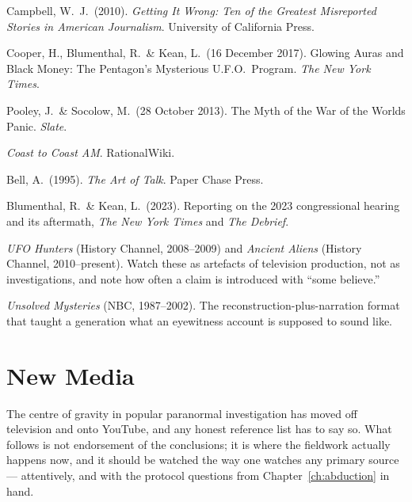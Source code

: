 \begin{list}{}{\setlength{\leftmargin}{1.2em}\setlength{\itemindent}{-1.2em}
\setlength{\itemsep}{3pt}}
\item Campbell, W.\ J.\ (2010). \emph{Getting It Wrong: Ten of the Greatest Misreported Stories in
American Journalism}. University of California Press.
\item Cooper, H., Blumenthal, R.\ \& Kean, L.\ (16 December 2017). Glowing Auras and Black Money: The
Pentagon's Mysterious U.F.O.\ Program. \emph{The New York Times}.
\item Pooley, J.\ \& Socolow, M.\ (28 October 2013). The Myth of the War of the Worlds Panic.
\emph{Slate}.
\item \emph{Coast to Coast AM}. RationalWiki.
\item Bell, A.\ (1995). \emph{The Art of Talk}. Paper Chase Press.
\item Blumenthal, R.\ \& Kean, L.\ (2023). Reporting on the 2023 congressional hearing and its
aftermath, \emph{The New York Times} and \emph{The Debrief}.
\item \emph{UFO Hunters} (History Channel, 2008--2009) and \emph{Ancient Aliens} (History Channel,
2010--present). Watch these as artefacts of television production, not as investigations, and note
how often a claim is introduced with ``some believe.''
\item \emph{Unsolved Mysteries} (NBC, 1987--2002). The reconstruction-plus-narration format that
taught a generation what an eyewitness account is supposed to sound like.
\end{list}

\section*{New Media}

The centre of gravity in popular paranormal investigation has moved off television and onto
YouTube, and any honest reference list has to say so. What follows is not endorsement of the
conclusions; it is where the fieldwork actually happens now, and it should be watched the way one
watches any primary source --- attentively, and with the protocol questions from
Chapter~\ref{ch:abduction} in hand.

